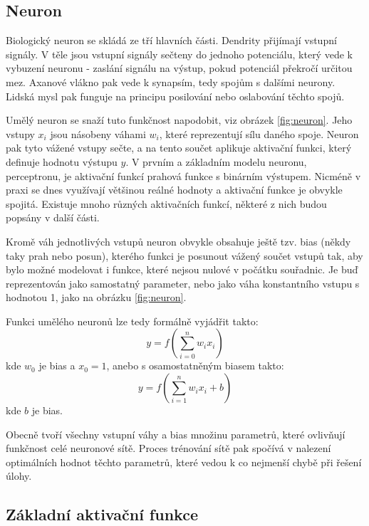 \subsection{Neuron}
Biologický neuron se skládá ze tří hlavních části. Dendrity přijímají vstupní
signály. V těle jsou vstupní signály sečteny do jednoho potenciálu, který vede
k vybuzení neuronu - zaslání signálu na výstup, pokud potenciál překročí
určitou mez. Axanové vlákno pak vede k synapsím, tedy spojům s dalšími neurony.
Lidská mysl pak funguje na principu posilování nebo oslabování těchto spojů.

Umělý neuron se snaží tuto funkčnost napodobit, viz obrázek \ref{fig:neuron}.
Jeho vstupy $x_i$ jsou násobeny váhami $w_i$, které reprezentují sílu daného
spoje. Neuron pak tyto vážené vstupy sečte, a na tento součet aplikuje
aktivační funkci, který definuje hodnotu výstupu $y$. V prvním a základním
modelu neuronu, perceptronu, je aktivační funkcí prahová funkce s binárním
výstupem. Nicméně v praxi se dnes využívají většinou reálné hodnoty a aktivační
funkce je obvykle spojitá. \cite{Vondrak1994} Existuje mnoho různých
aktivačních funkcí, některé z nich budou popsány v další části.

Kromě váh jednotlivých vstupů neuron obvykle obsahuje ještě tzv. bias (někdy
taky prah nebo posun), kterého funkci je posunout vážený součet vstupů tak, aby
bylo možné modelovat i funkce, které nejsou nulové v počátku souřadnic. Je buď
reprezentován jako samostatný parameter, nebo jako váha konstantního vstupu s
hodnotou 1, jako na obrázku \ref{fig:neuron}.

Funkci umělého neuronů lze tedy formálně vyjádřit takto:
\begin{equation}
    y=f\left(\sum_{i=0}^{n}w_{i}x_{i}\right)
\end{equation}
kde $w_0$ je bias a $x_0=1$, anebo s osamostatněným biasem takto:
\begin{equation}
    y = f\left(\sum_{i=1}^{n} w_i x_i + b\right)
\end{equation}
kde $b$ je bias.

Obecně tvoří všechny vstupní váhy a bias množinu parametrů, které ovlivňují
funkčnost celé neuronové sítě. Proces trénování sítě pak spočívá v nalezení
optimálních hodnot těchto parametrů, které vedou k co nejmenší chybě při řešení
úlohy.

\subsection{Základní aktivační funkce}

